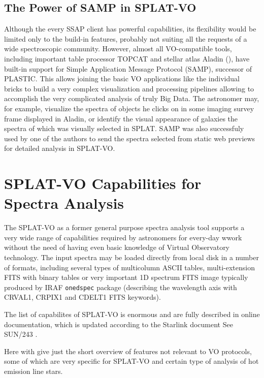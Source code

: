 \documentclass[final,authoryear,5p,times,twocolumn]{elsarticle}
\begin{document}

\subsection{The Power of SAMP in SPLAT-VO}

Although the every SSAP client has  powerful capabilities, its flexibility
would be limited only to the build-in features, probably not suiting all the
requests of a wide spectroscopic community. However, almost all VO-compatible
tools, including important table processor TOPCAT and stellar atlas
Aladin (),
have built-in support for Simple Application Message Protocol (SAMP), successor
of PLASTIC.  This allows joining the basic VO applications like the individual
bricks to build a very complex visualization and processing pipelines allowing
to accomplish the very complicated analysis of truly Big Data.  The astronomer
may, for example, visualize the spectra of objects he clicks on in some imaging
survey frame displayed in Aladin, or identify the visual appearance of galaxies
the spectra of which was visually selected in SPLAT.  SAMP was also successfuly
used by one of the authors to send the spectra selected from   static web
previews for detailed analysis in SPLAT-VO.


\section{SPLAT-VO Capabilities  for Spectra Analysis}

The SPLAT-VO as a former general purpose spectra analysis tool supports a very
wide range of capabilities required by astronomers for every-day wwork without
the need of having even basic knowledge of Virtual Observatory technology. The
input spectra may be loaded directly from local disk in a number of formats,
including several types of multicolumn ASCII tables, multi-extension FITS with
binary tables or very important 1D spectrum FITS image typically produced by
IRAF {\tt onedspec} package (describing the wavelength axis with CRVAL1, CRPIX1
and CDELT1 FITS keywords).   

The list of capabilites of SPLAT-VO is enormous and are fully described in
online documentation, which is updated according to the Starlink document  See SUN/243 
\cite{SUN243}.

Here with give just the short overview of features not relevant to VO
protocols, some of which are very
specific for SPLAT-VO and certain type of analysis of hot emission line stars.
\end{document}
